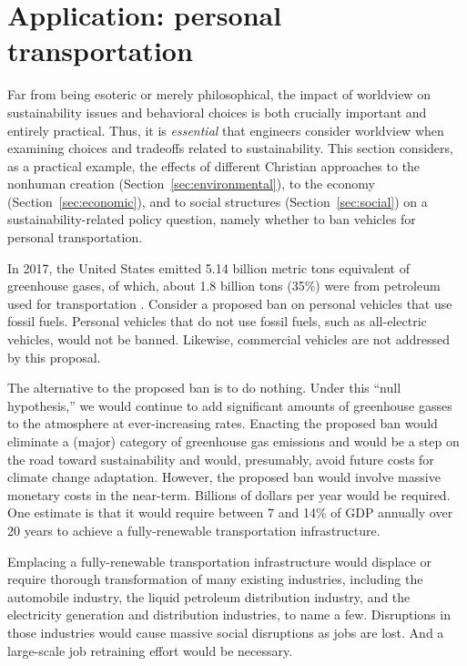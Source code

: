 \documentclass[12pt]{article}
\begin{document}
\section{Application: personal transportation}
\label{sec:personal_transportation}

Far from being esoteric or merely philosophical, 
the impact of worldview on sustainability issues and behavioral choices 
is both crucially important and entirely practical. 
Thus, it is \emph{essential} that engineers consider worldview
when examining choices and tradeoffs related to sustainability.
This section considers, as a practical example, the effects of different Christian approaches
to the nonhuman creation (Section~\ref{sec:environmental}),
to the economy (Section~\ref{sec:economic}), and 
to social structures (Section~\ref{sec:social})
on a sustainability-related policy question, 
namely whether to ban vehicles for personal transportation.

In 2017, the United States emitted 5.14 billion metric tons equivalent of greenhouse gases, 
of which, about 1.8 billion tons (35\%) were from petroleum used for transportation \cite{EIA2017}.
Consider a proposed ban on personal vehicles that use fossil fuels.
Personal vehicles that do not use fossil fuels, such as all-electric vehicles, would not be banned. 
Likewise, commercial vehicles are not addressed by this proposal. %

The alternative to the proposed ban is to do nothing. 
Under this ``null hypothesis,'' 
we would continue to add significant amounts of greenhouse gasses to the atmosphere 
at ever-increasing rates.
Enacting the proposed ban would eliminate a (major) category 
of greenhouse gas emissions and 
would be a step on the road toward sustainability
and would, presumably, avoid future costs for climate change adaptation.
However, the proposed ban would involve massive monetary costs in the near-term. 
Billions of dollars per year would be required. 
One estimate is that it would require between 7 and 14\% of GDP annually 
over 20 years to achieve a fully-renewable transportation infrastructure.

Emplacing a fully-renewable transportation infrastructure 
would displace or require thorough transformation of many existing industries, including 
the automobile industry, 
the liquid petroleum distribution industry, and
the electricity generation and distribution industries,
to name a few.
Disruptions in those industries 
would cause massive social disruptions 
as jobs are lost.
And a large-scale job retraining effort would be necessary.
\end{document}
